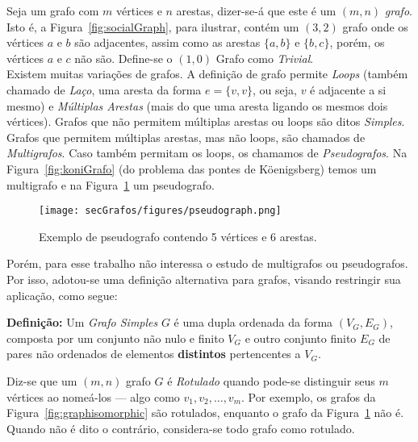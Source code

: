 Seja um grafo com $m$ vértices e $n$ arestas, dizer-se-á que este é um $(m, n)$ \textit{grafo}. Isto é, a Figura~\ref{fig:socialGraph}, para ilustrar, contém um $(3,2)$ grafo onde os vértices $a$ e $b$ são adjacentes, assim como as arestas $\{a, b\}$ e $\{b, c\}$, porém, os vértices $a$ e $c$ não são.
Define-se o $(1,0)$ Grafo como \textit{Trivial}.
\\

Existem muitas variações de grafos. A definição de grafo permite \textit{Loops} (também chamado de \textit{Laço}, uma aresta da forma $e = \{v,v\}$, ou seja, $v$ é adjacente a si mesmo) e \textit{Múltiplas Arestas} (mais do que uma aresta ligando os mesmos dois vértices). Grafos que não permitem múltiplas arestas ou loops são ditos \textit{Simples}. Grafos que permitem múltiplas arestas, mas não loops, são chamados de \textit{Multigrafos}. Caso também permitam os loops, os chamamos de \textit{Pseudografos}. Na Figura~\ref{fig:koniGrafo} (do problema das pontes de Köenigsberg) temos um multigrafo e na Figura~\ref{fig:pseudograph} um pseudografo.

\begin{figure}[H]
	\begin{center}
		\texttt{[image: secGrafos/figures/pseudograph.png]}
	\end{center}
	\caption{Exemplo de pseudografo contendo 5 vértices e 6 arestas.}
	\label{fig:pseudograph}
\end{figure}

Porém, para esse trabalho não interessa o estudo de multigrafos ou pseudografos. Por isso, adotou-se uma definição alternativa para grafos, visando restringir sua aplicação, como segue:

\begin{center}
	\begin{minipage}{0.9 \linewidth}
		\textbf{Definição:} Um \textit{Grafo Simples} $G$ é uma dupla ordenada da forma $(V_G,E_G)$, composta por um conjunto não nulo e finito $V_G$ e outro conjunto finito $E_G$ de pares não ordenados de elementos \textbf{distintos} pertencentes a $V_G$.
	\end{minipage}
\end{center} 

Diz-se que um $(m,n)$ grafo $G$ é \textit{Rotulado} quando pode-se distinguir seus $m$ vértices ao nomeá-los --- algo como $v_1, v_2, \dots, v_m$. Por exemplo, os grafos da Figura~\ref{fig:graphisomorphic} são rotulados, enquanto o grafo da Figura~\ref{fig:pseudograph} não é. Quando não é dito o contrário, considera-se todo grafo como rotulado.

